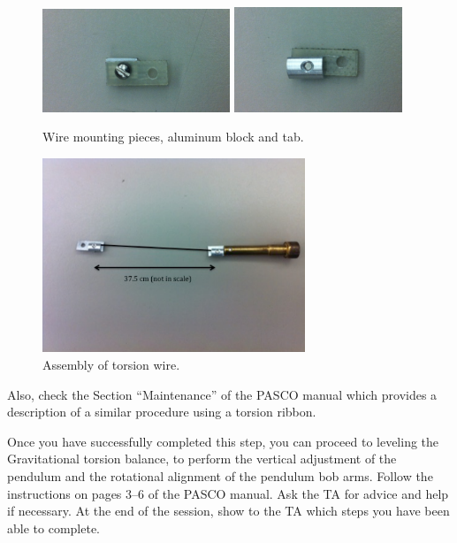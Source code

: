 \begin{figure}
	\centering
	\includegraphics[width=0.5\textwidth]{cavendish/pasco-block}%
	\includegraphics[width=0.45\textwidth]{cavendish/pasco-tab}
	\caption{Wire mounting pieces, aluminum block and tab.}\label{cav:fig:pasco-block}
\end{figure}

\begin{figure}
	\centering
	\includegraphics[width=0.7\textwidth]{cavendish/pasco-assembly}
	\caption{Assembly of torsion wire.}\label{cav:fig:pasco-assembly}
\end{figure}

Also, check the Section ``Maintenance'' of the PASCO manual which provides a
description of a similar procedure using a torsion ribbon.

Once you have successfully completed this step, you can proceed to leveling the
Gravitational torsion balance, to perform the vertical adjustment of the pendulum and the
rotational alignment of the pendulum bob arms. Follow the instructions on pages 3--6 of
the PASCO manual. Ask the TA for advice and help if necessary. At the end of the
session, show to the TA which steps you have been able to complete.

